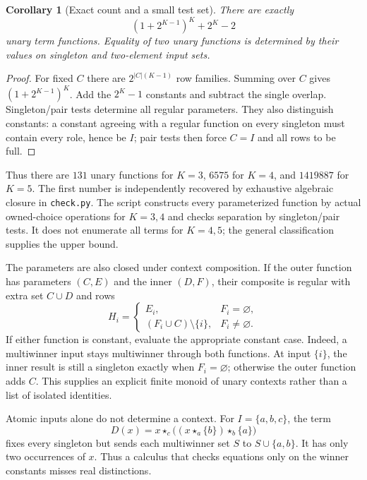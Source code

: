 \documentclass[11pt]{article}
\newtheorem{corollary}[theorem]{Corollary}
\newcommand{\ow}[1]{\mathbin{\star_{#1}}}
\begin{document}
\begin{corollary}[Exact count and a small test set]
There are exactly
\begin{equation}\label{eq:count}
  (1+2^{K-1})^K+2^K-2
\end{equation}
unary term functions. Equality of two unary functions is determined by
their values on singleton and two-element input sets.
\end{corollary}
\begin{proof}
For fixed $C$ there are $2^{|C|(K-1)}$ row families. Summing over $C$
gives $(1+2^{K-1})^K$. Add the $2^K-1$ constants and subtract the single
overlap. Singleton/pair tests determine all regular parameters. They
also distinguish constants: a constant agreeing with a regular function
on every singleton must contain every role, hence be $I$; pair tests
then force $C=I$ and all rows to be full.
\end{proof}

Thus there are $131$ unary functions for $K=3$, $6575$ for $K=4$, and
$1419887$ for $K=5$. The first number is independently recovered by
exhaustive algebraic closure in \texttt{check.py}. The script constructs
every parameterized function by actual owned-choice operations for
$K=3,4$ and checks separation by singleton/pair tests. It does not
enumerate all terms for $K=4,5$; the general classification supplies the
upper bound.

The parameters are also closed under context composition. If the outer
function has parameters $(C,E)$ and the inner $(D,F)$, their composite is
regular with extra set $C\cup D$ and rows
\[
 H_i=\begin{cases}
 E_i,&F_i=\varnothing,\\
 (F_i\cup C)\setminus\{i\},&F_i\ne\varnothing.
 \end{cases}
\]
If either function is constant, evaluate the appropriate constant case.
Indeed, a multiwinner input stays multiwinner through both functions. At
input $\{i\}$, the inner result is still a singleton exactly when
$F_i=\varnothing$; otherwise the outer function adds $C$.
This supplies an explicit finite monoid of unary contexts rather than a
list of isolated identities.

Atomic inputs alone do not determine a context. For $I=\{a,b,c\}$, the term
\[
 D(x)=x\ow c\bigl((x\ow a\{b\})\ow b\{a\}\bigr)
\]
fixes every singleton but sends each multiwinner set $S$ to
$S\cup\{a,b\}$. It has only two occurrences of $x$. Thus a calculus that
checks equations only on the winner constants misses real distinctions.
\end{document}
